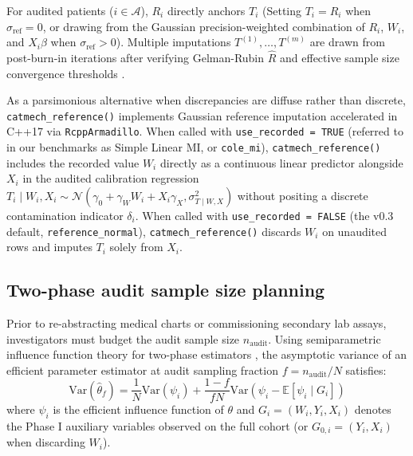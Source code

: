 \documentclass[
]{article}
\begin{document}
For audited patients (\(i \in \mathcal{A}\)), \(R_i\) directly anchors
\(T_i\) (Setting \(T_i = R_i\) when \(\sigma_{\text{ref}} = 0\), or
drawing from the Gaussian precision-weighted combination of \(R_i\),
\(W_i\), and \(X_i \beta\) when \(\sigma_{\text{ref}} > 0\)). Multiple
imputations \(T^{(1)}, \dots, T^{(m)}\) are drawn from post-burn-in
iterations after verifying Gelman-Rubin \(\hat{R}\) and effective sample
size convergence thresholds \citep{gelman1992inference}.

As a parsimonious alternative when discrepancies are diffuse rather than
discrete, \texttt{catmech\_reference()} implements Gaussian reference
imputation accelerated in C++17 via \texttt{RcppArmadillo}. When called
with \texttt{use\_recorded\ =\ TRUE} (referred to in our benchmarks as
Simple Linear MI, or \texttt{cole\_mi}), \texttt{catmech\_reference()}
includes the recorded value \(W_i\) directly as a continuous linear
predictor alongside \(X_i\) in the audited calibration regression
\(T_i \mid W_i, X_i \sim \mathcal{N}(\gamma_0 + \gamma_W W_i + X_i \gamma_X, \sigma_{T \mid W, X}^2)\)
without positing a discrete contamination indicator \(\delta_i\). When
called with \texttt{use\_recorded\ =\ FALSE} (the v0.3 default,
\texttt{reference\_normal}), \texttt{catmech\_reference()} discards
\(W_i\) on unaudited rows and imputes \(T_i\) solely from \(X_i\).

\subsection{Two-phase audit sample size
planning}\label{two-phase-audit-sample-size-planning}

Prior to re-abstracting medical charts or commissioning secondary lab
assays, investigators must budget the audit sample size
\(n_{\text{audit}}\). Using semiparametric influence function theory for
two-phase estimators
\citep{neyman1938contribution, cochran1977sampling, breslow2003semiparametric, angelopoulos2023prediction},
the asymptotic variance of an efficient parameter estimator at audit
sampling fraction \(f = n_{\text{audit}} / N\) satisfies:
\[\text{Var}(\hat{\theta}_f) = \frac{1}{N} \text{Var}(\psi_i) + \frac{1 - f}{f N} \text{Var}(\psi_i - \mathbb{E}[\psi_i \mid G_i])\]
where \(\psi_i\) is the efficient influence function of \(\theta\) and
\(G_i = (W_i, Y_i, X_i)\) denotes the Phase I auxiliary variables
observed on the full cohort (or \(G_{0,i} = (Y_i, X_i)\) when discarding
\(W_i\)).
\end{document}
